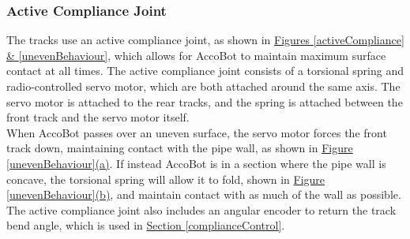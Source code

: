 \documentclass[11pt]{article}		%
\newcommand{\sectref}[1]{\hyperref[#1]{Section \ref*{#1}}}     %
\begin{document}
			\subsubsection{Active Compliance Joint} \label{trackDetails}
			
				The tracks use an active compliance joint, as shown in \hyperref[activeCompliance]{Figures \ref*{activeCompliance} \& \ref*{unevenBehaviour}}, which allows for AccoBot to maintain maximum surface contact at all times.
				The active compliance joint consists of a torsional spring and radio-controlled servo motor, which are both attached around the same axis.
				The servo motor is attached to the rear tracks, and the spring is attached between the front track and the servo motor itself.
				\\
                \hspace*{2ex}When AccoBot passes over an uneven surface, the servo motor forces the front track down, maintaining contact with the pipe wall, as shown in \hyperref[unevenBehaviour]{Figure \ref*{unevenBehaviour}(a)}.
				If instead AccoBot is in a section where the pipe wall is concave, the torsional spring will allow it to fold, shown in \hyperref[unevenBehaviour]{Figure \ref*{unevenBehaviour}(b)}, and maintain contact with as much of the wall as possible.
				The active compliance joint also includes an angular encoder to return the track bend angle, which is used in \sectref{complianceControl}.
\end{document}
